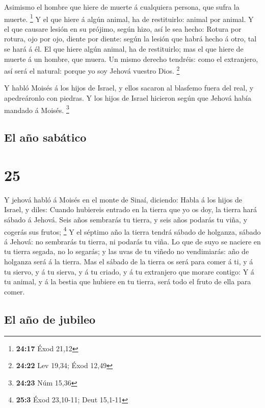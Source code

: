  Asimismo el hombre que hiere de muerte á cualquiera
persona, que sufra la muerte. \footnote{\textbf{24:17} Éxod 21,12}
 Y el que hiere á algún animal, ha de restituirlo: animal
por animal.  Y el que causare lesión en su prójimo, según
hizo, así le sea hecho:  Rotura por rotura, ojo por ojo,
diente por diente: según la lesión que habrá hecho á otro, tal se hará á
él.  El que hiere algún animal, ha de restituirlo; mas el
que hiere de muerte á un hombre, que muera.  Un mismo
derecho tendréis: como el extranjero, así será el natural: porque yo soy
Jehová vuestro Dios. \footnote{\textbf{24:22} Lev 19,34; Éxod 12,49}

 Y habló Moisés á los hijos de Israel, y ellos sacaron al
blasfemo fuera del real, y apedreáronlo con piedras. Y los hijos de
Israel hicieron según que Jehová había mandado á Moisés. \footnote{\textbf{24:23}
  Núm 15,36}

\hypertarget{el-auxf1o-sabuxe1tico}{%
\subsection{El año sabático}\label{el-auxf1o-sabuxe1tico}}

\hypertarget{section-24}{%
\section{25}\label{section-24}}

 Y jehová habló á Moisés en el monte de Sinaí, diciendo:
 Habla á los hijos de Israel, y diles: Cuando hubiereis
entrado en la tierra que yo os doy, la tierra hará sábado á Jehová.
 Seis años sembrarás tu tierra, y seis años podarás tu viña,
y cogerás sus frutos; \footnote{\textbf{25:3} Éxod 23,10-11; Deut
  15,1-11}  Y el séptimo año la tierra tendrá sábado de
holganza, sábado á Jehová: no sembrarás tu tierra, ni podarás tu viña.
 Lo que de suyo se naciere en tu tierra segada, no lo
segarás; y las uvas de tu viñedo no vendimiarás: año de holganza será á
la tierra.  Mas el sábado de la tierra os será para comer á
ti, y á tu siervo, y á tu sierva, y á tu criado, y á tu extranjero que
morare contigo:  Y á tu animal, y á la bestia que hubiere en
tu tierra, será todo el fruto de ella para comer.

\hypertarget{el-auxf1o-de-jubileo}{%
\subsection{El año de jubileo}\label{el-auxf1o-de-jubileo}}

